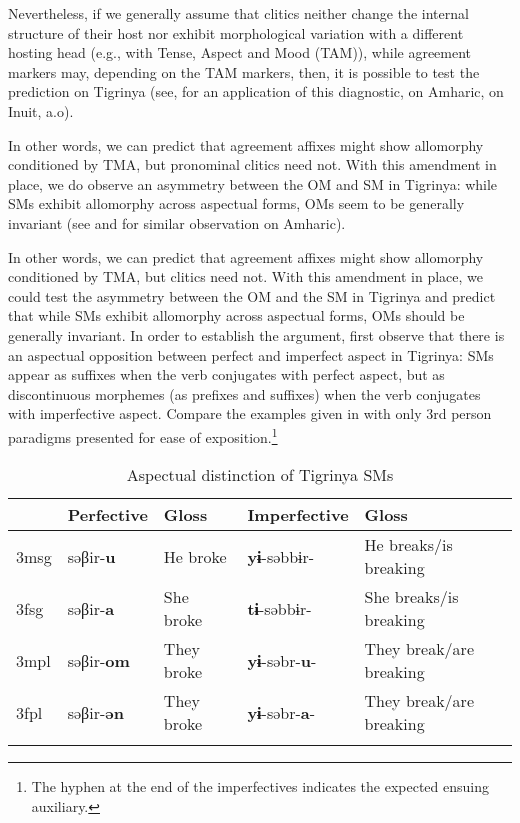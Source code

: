 \documentclass[output=paper]{langscibook}
\begin{document}
Nevertheless, if we generally assume that clitics neither change the internal structure of their host nor exhibit morphological variation with a different hosting head (e.g., with Tense, Aspect and Mood (TAM)), while agreement markers may, depending on the TAM markers, then, it is possible to test the prediction on Tigrinya (see, for an application of this diagnostic, \citealt{kramer14} on Amharic, \citealt{compton16} on Inuit, a.o).

In other words, we can predict that agreement affixes might show allomorphy conditioned by TMA, but pronominal clitics need not. With this amendment in place, we do observe an asymmetry between the OM and SM in Tigrinya: while SMs exhibit allomorphy across aspectual forms, OMs seem to be generally invariant (see \citealt{baker12} and \citealt{kramer14} for similar observation on Amharic). 

In other words, we can predict that agreement affixes might show allomorphy conditioned by TMA, but clitics need not. With this amendment in place, we could test the asymmetry between the OM and the SM in Tigrinya and predict that while SMs exhibit allomorphy across aspectual forms, OMs should be generally invariant. 
In order to establish the argument, first observe that there is an aspectual opposition between perfect and imperfect aspect in Tigrinya: SMs appear as suffixes when the verb conjugates with perfect aspect, but as discontinuous morphemes (as prefixes and suffixes) when the verb conjugates with imperfective aspect.
Compare the examples given in  with only 3rd person paradigms presented for ease of exposition.\footnote{The hyphen at the end of the imperfectives indicates the expected ensuing auxiliary.}

\begin{table}
\caption{Aspectual distinction of Tigrinya SMs\label{tab:Gebregziabher:Table2}}
\begin{tabular}{ *{5}{l} }
\lsptoprule
&Perfective &Gloss & Imperfective &Gloss \\\midrule
3msg & səβir-\textbf{u} &He broke &{\textbf{yɨ}}-səbbɨr- & He breaks/is breaking \\ 
3fsg & səβir-\textbf{a} &She broke & {\textbf{tɨ}}-səbbɨr- & She breaks/is breaking \\
3mpl & səβir-\textbf{om} &They broke & {\textbf{yɨ}}-səbr-{\textbf{u}}- & They break/are breaking \\ 
3fpl & səβir-\textbf{ən} &They broke & {\textbf{yɨ}}-səbr-{\textbf{a}}- & They break/are breaking \\
\lspbottomrule 
\end{tabular}
\end{table}
\end{document}
